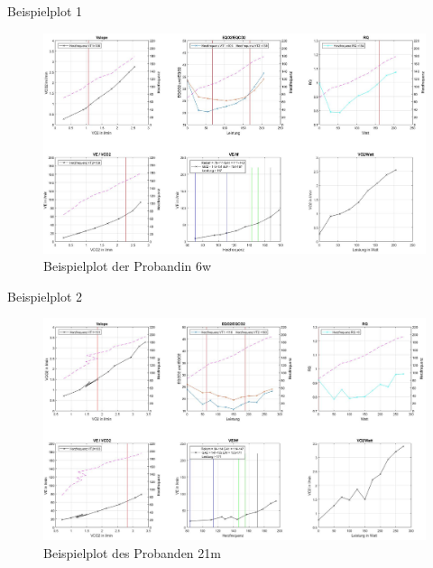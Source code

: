 \documentclass[colorBG,slideColor,8pt]{beamer}
\begin{document}
\begin{frame}{Beispielplot 1}
	\begin{figure}[H]
		\centering
			\includegraphics[width=0.85\linewidth]{Bilder/auto_6.png}
			\caption{Beispielplot der Probandin 6w}
	\end{figure}
\end{frame}

\begin{frame}{Beispielplot 2}
	\begin{figure}[H]
		\centering
			\includegraphics[width=0.85\linewidth]{Bilder/auto_21.png}
			\caption{Beispielplot des Probanden 21m}
	\end{figure}
\end{frame}
\end{document}
